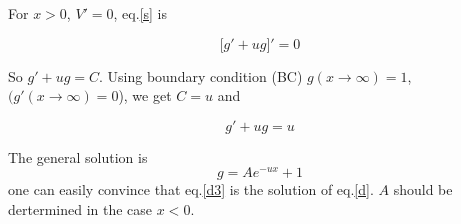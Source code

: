 \documentclass{../Templetes/1c}
\begin{document}
For $x>0$, $V'=0$, eq.\eqref{s} is 

\begin{equation} \label{d}
\big[
g'+ug
\big]'=0
\end{equation}

So $g'+ug=C$. Using boundary condition (BC) $g(x\rightarrow \infty)=1$, 
$(g'(x\rightarrow\infty)=0$), we get $C=u$ and 

\begin{equation} \label{d2}
g'+ug=u
\end{equation}

The general solution is
\begin{equation} \label{d3}
g=Ae^{-ux}+1
\end{equation}
one can easily convince that eq.\eqref{d3} is the solution of eq.\eqref{d}. 
$A$ should be dertermined in the case $x<0$.
\end{document}
